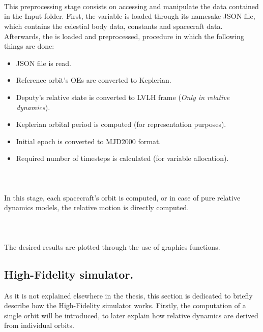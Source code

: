 	\paragraph{  \\}
	\indent This preprocessing stage consists on accessing and manipulate the data contained in the Input folder. First, the  variable is loaded through its namesake JSON file, which contains the celestial body data, constants and spacecraft data. Afterwards, the  is loaded and preprocessed, procedure in which the following things are done:
	\begin{itemize}
	\item[\GMVred{\nth{1}}] JSON file is read.
	\item[\GMVred{\nth{2}}] Reference orbit's OEs are converted to Keplerian.
	\item[\GMVred{\nth{3}}] Deputy's relative state is converted to LVLH frame (\textsl{Only in relative dynamics}).
	\item[\GMVred{\nth{4}}] Keplerian orbital period is computed (for representation purposes).
	\item[\GMVred{\nth{5}}] Initial epoch is converted to MJD2000 format.
	\item[\GMVred{\nth{6}}] Required number of timesteps is calculated (for variable allocation).
	\end{itemize}
	\paragraph{  \\}
	\indent In this stage, each spacecraft's orbit is computed, or in case of pure relative dynamics models, the relative motion is directly computed.
	\paragraph{  \\}
	\indent The desired results are plotted through the use of graphics functions.
	\subsection{High-Fidelity simulator.}\label{secAppD:HiFi_sim}
	\indent As it is not explained elsewhere in the thesis, this section is dedicated to briefly describe how the High-Fidelity simulator works. Firstly, the computation of a single orbit will be introduced, to later explain how relative dynamics are derived from individual orbits.
